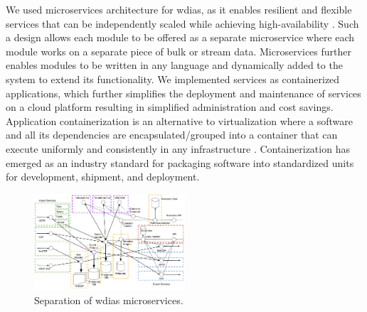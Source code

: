 \documentclass[conference]{IEEEtran}
\begin{document}
We used microservices architecture for \acrshort{wdias}, as it enables resilient and flexible services that can be independently scaled while achieving high-availability \cite{LewisMicroservices}. Such a design allows each module to be offered as a separate microservice where each module works on a separate piece of bulk or stream data. Microservices further enables modules to be written in any language and dynamically added to the system to extend its functionality. We implemented services as containerized applications, which further simplifies the deployment and maintenance of services on a cloud platform resulting in simplified administration and cost savings. Application containerization is an alternative to virtualization where a software and all its dependencies are encapsulated/grouped into a container that can execute uniformly and consistently in any infrastructure \cite{IBMContainerizationExplained}. Containerization has emerged as an industry standard for packaging software into standardized units for development, shipment, and deployment.


\begin{figure}[!tb]
\centerline{\includegraphics[width=0.5\textwidth]{images/separation_microservices-p1.pdf}}
\caption{Separation of \acrshort{wdias} microservices.}
\label{pfi:microservice_separation}
\end{figure}
\end{document}
